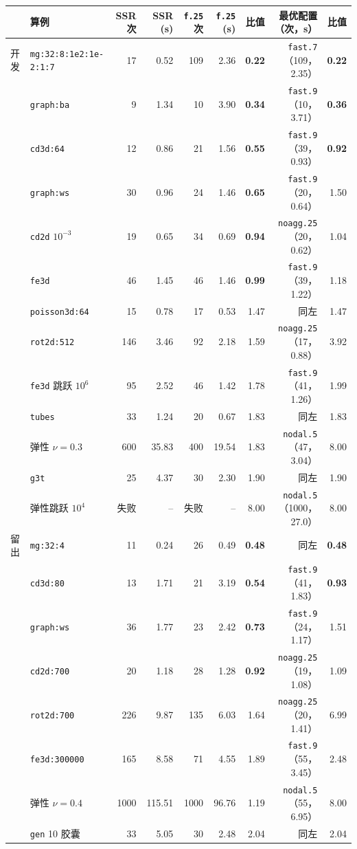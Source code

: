 \documentclass[11pt,a4paper]{ctexart}
\begin{document}
\begin{table}[H]
\centering\footnotesize\setlength{\tabcolsep}{4pt}
\begin{tabular}{llrrrrrrr}
\toprule
 & 算例 & SSR 次 & SSR (s) & \texttt{f.25} 次 & \texttt{f.25} (s) & 比值 & 最优配置（次，s） & 比值 \\
\midrule
开发 & \texttt{mg:32:8:1e2:1e-2:1:7} & 17 & 0.52 & 109 & 2.36 & \textbf{0.22} & \texttt{fast.7}（109，2.35） & \textbf{0.22} \\
 & \texttt{graph:ba} & 9 & 1.34 & 10 & 3.90 & \textbf{0.34} & \texttt{fast.9}（10，3.71） & \textbf{0.36} \\
 & \texttt{cd3d:64} & 12 & 0.86 & 21 & 1.56 & \textbf{0.55} & \texttt{fast.9}（39，0.93） & \textbf{0.92} \\
 & \texttt{graph:ws} & 30 & 0.96 & 24 & 1.46 & \textbf{0.65} & \texttt{fast.9}（20，0.64） & 1.50 \\
 & \texttt{cd2d} $10^{-3}$ & 19 & 0.65 & 34 & 0.69 & \textbf{0.94} & \texttt{noagg.25}（20，0.62） & 1.04 \\
 & \texttt{fe3d} & 46 & 1.45 & 46 & 1.46 & \textbf{0.99} & \texttt{fast.9}（39，1.22） & 1.18 \\
 & \texttt{poisson3d:64} & 15 & 0.78 & 17 & 0.53 & 1.47 & 同左 & 1.47 \\
 & \texttt{rot2d:512} & 146 & 3.46 & 92 & 2.18 & 1.59 & \texttt{noagg.25}（17，0.88） & 3.92 \\
 & \texttt{fe3d} 跳跃 $10^6$ & 95 & 2.52 & 46 & 1.42 & 1.78 & \texttt{fast.9}（41，1.26） & 1.99 \\
 & \texttt{tubes} & 33 & 1.24 & 20 & 0.67 & 1.83 & 同左 & 1.83 \\
 & 弹性 $\nu=0.3$ & 600 & 35.83 & 400 & 19.54 & 1.83 & \texttt{nodal.5}（47，3.04） & 8.00 \\
 & \texttt{g3t} & 25 & 4.37 & 30 & 2.30 & 1.90 & 同左 & 1.90 \\
 & 弹性跳跃 $10^4$ & 失败 & -- & 失败 & -- & 8.00 & \texttt{nodal.5}（1000，27.0） & 8.00 \\
\midrule
留出 & \texttt{mg:32:4} & 11 & 0.24 & 26 & 0.49 & \textbf{0.48} & 同左 & \textbf{0.48} \\
 & \texttt{cd3d:80} & 13 & 1.71 & 21 & 3.19 & \textbf{0.54} & \texttt{fast.9}（41，1.83） & \textbf{0.93} \\
 & \texttt{graph:ws} & 36 & 1.77 & 23 & 2.42 & \textbf{0.73} & \texttt{fast.9}（24，1.17） & 1.51 \\
 & \texttt{cd2d:700} & 20 & 1.18 & 28 & 1.28 & \textbf{0.92} & \texttt{noagg.25}（19，1.08） & 1.09 \\
 & \texttt{rot2d:700} & 226 & 9.87 & 135 & 6.03 & 1.64 & \texttt{noagg.25}（20，1.41） & 6.99 \\
 & \texttt{fe3d:300000} & 165 & 8.58 & 71 & 4.55 & 1.89 & \texttt{fast.9}（55，3.45） & 2.48 \\
 & 弹性 $\nu=0.4$ & 1000 & 115.51 & 1000 & 96.76 & 1.19 & \texttt{nodal.5}（55，6.95） & 8.00 \\
 & \texttt{gen} 10 胶囊 & 33 & 5.05 & 30 & 2.48 & 2.04 & 同左 & 2.04 \\
\bottomrule
\end{tabular}
\end{table}
\end{document}
